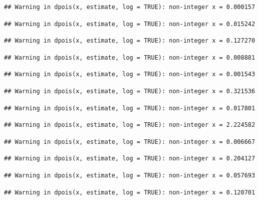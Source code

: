 \documentclass[]{article}
\begin{document}
\begin{verbatim}
## Warning in dpois(x, estimate, log = TRUE): non-integer x = 0.000157
\end{verbatim}

\begin{verbatim}
## Warning in dpois(x, estimate, log = TRUE): non-integer x = 0.015242
\end{verbatim}

\begin{verbatim}
## Warning in dpois(x, estimate, log = TRUE): non-integer x = 0.127270
\end{verbatim}

\begin{verbatim}
## Warning in dpois(x, estimate, log = TRUE): non-integer x = 0.008881
\end{verbatim}

\begin{verbatim}
## Warning in dpois(x, estimate, log = TRUE): non-integer x = 0.001543
\end{verbatim}

\begin{verbatim}
## Warning in dpois(x, estimate, log = TRUE): non-integer x = 0.321536
\end{verbatim}

\begin{verbatim}
## Warning in dpois(x, estimate, log = TRUE): non-integer x = 0.017801
\end{verbatim}

\begin{verbatim}
## Warning in dpois(x, estimate, log = TRUE): non-integer x = 2.224582
\end{verbatim}

\begin{verbatim}
## Warning in dpois(x, estimate, log = TRUE): non-integer x = 0.006667
\end{verbatim}

\begin{verbatim}
## Warning in dpois(x, estimate, log = TRUE): non-integer x = 0.204127
\end{verbatim}

\begin{verbatim}
## Warning in dpois(x, estimate, log = TRUE): non-integer x = 0.057693
\end{verbatim}

\begin{verbatim}
## Warning in dpois(x, estimate, log = TRUE): non-integer x = 0.120701
\end{verbatim}
\end{document}
